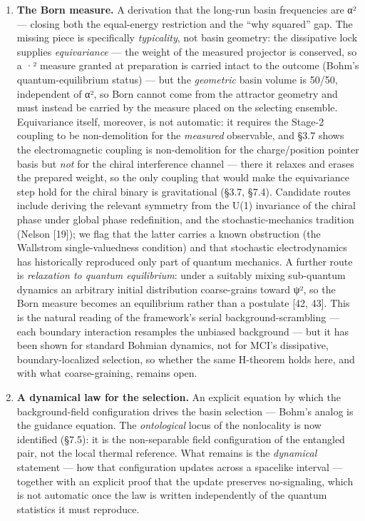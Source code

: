 \documentclass[
]{article}
\providecommand{\tightlist}{%
  \setlength{\itemsep}{0pt}\setlength{\parskip}{0pt}}
\begin{document}
\begin{enumerate}
\def\labelenumi{\arabic{enumi}.}
\tightlist
\item
  \textbf{The Born measure.} A derivation that the long-run basin
  frequencies are \textbar α\textbar² --- closing both the equal-energy
  restriction and the ``why squared'' gap. The missing piece is
  specifically \emph{typicality}, not basin geometry: the dissipative
  lock supplies \emph{equivariance} --- the weight of the measured
  projector is conserved, so a \textbar·\textbar² measure granted at
  preparation is carried intact to the outcome (Bohm's
  quantum-equilibrium status) --- but the \emph{geometric} basin volume
  is 50/50, independent of \textbar α\textbar², so Born cannot come from
  the attractor geometry and must instead be carried by the measure
  placed on the selecting ensemble. Equivariance itself, moreover, is
  not automatic: it requires the Stage-2 coupling to be non-demolition
  for the \emph{measured} observable, and §3.7 shows the electromagnetic
  coupling is non-demolition for the charge/position pointer basis but
  \emph{not} for the chiral interference channel --- there it relaxes
  and erases the prepared weight, so the only coupling that would make
  the equivariance step hold for the chiral binary is gravitational
  (§3.7, §7.4). Candidate routes include deriving the relevant symmetry
  from the U(1) invariance of the chiral phase under global phase
  redefinition, and the stochastic-mechanics tradition (Nelson
  {[}19{]}); we flag that the latter carries a known obstruction (the
  Wallstrom single-valuedness condition) and that stochastic
  electrodynamics has historically reproduced only part of quantum
  mechanics. A further route is \emph{relaxation to quantum
  equilibrium}: under a suitably mixing sub-quantum dynamics an
  arbitrary initial distribution coarse-grains toward
  \textbar ψ\textbar², so the Born measure becomes an equilibrium rather
  than a postulate {[}42, 43{]}. This is the natural reading of the
  framework's serial background-scrambling --- each boundary interaction
  resamples the unbiased background --- but it has been shown for
  standard Bohmian dynamics, not for MCI's dissipative,
  boundary-localized selection, so whether the same H-theorem holds
  here, and with what coarse-graining, remains open.
\item
  \textbf{A dynamical law for the selection.} An explicit equation by
  which the background-field configuration drives the basin selection
  --- Bohm's analog is the guidance equation. The \emph{ontological}
  locus of the nonlocality is now identified (§7.5): it is the
  non-separable field configuration of the entangled pair, not the local
  thermal reference. What remains is the \emph{dynamical} statement ---
  how that configuration updates across a spacelike interval ---
  together with an explicit proof that the update preserves
  no-signaling, which is not automatic once the law is written
  independently of the quantum statistics it must reproduce.
\end{enumerate}
\end{document}
